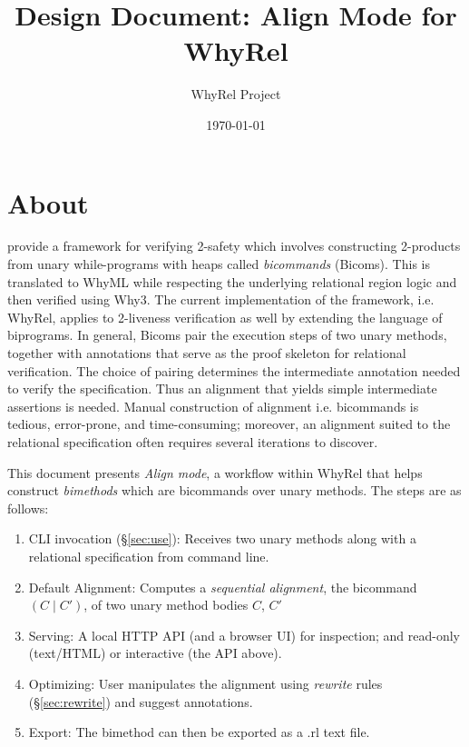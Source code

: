 \documentclass[11pt]{article}
\title{Design Document: Align Mode for WhyRel}
\author{WhyRel Project}
\date{\today}
\begin{document}
\maketitle

\tableofcontents
\newpage

\section{About}

\cite{banerjee-toplas-2022} provide a framework for verifying 2-safety which involves
constructing 2-products from unary while-programs with heaps called
\emph{bicommands} (Bicoms). This is translated to WhyML while
respecting the underlying relational region logic and then verified using Why3. The current implementation of the
framework, i.e. WhyRel, applies to 2-liveness verification as well by extending the language
of biprograms. In general, Bicoms pair the execution steps of two unary methods,
together with annotations that serve as the proof skeleton for relational
verification. The choice of pairing determines the intermediate annotation needed to verify the specification. Thus an alignment that yields simple intermediate assertions is needed. Manual construction of alignment i.e. bicommands is tedious, error-prone, and
time-consuming; moreover, an alignment suited to the relational
specification often requires several iterations to discover.  

This document presents \emph{Align mode}, a workflow within WhyRel that helps construct \emph{bimethods} which are bicommands over unary methods. The steps are as follows:

\begin{enumerate}
  \item CLI invocation (\S\ref{sec:use}): Receives two unary methods along with a relational specification from command line.
  \item Default Alignment: Computes a \emph{sequential alignment}, the bicommand $(C \mid C')$, of two unary method bodies $C$, $C'$
  \item Serving: A local HTTP API (and a browser UI) for inspection; and
  read-only (text/HTML) or interactive (the API above).
  \item Optimizing: User manipulates the alignment using \emph{rewrite} rules (\S\ref{sec:rewrite})  and suggest  annotations. 
  \item Export: The bimethod can then be exported as a .rl text file.
\end{enumerate}
\end{document}
